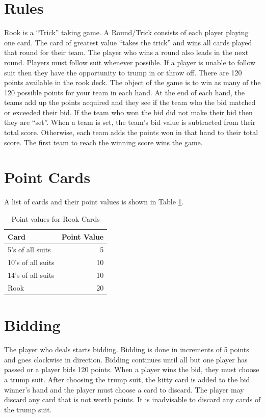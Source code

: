 \documentclass[12pt]{report}
\begin{document}
\section{Rules}

Rook is a ``Trick'' taking game. A Round/Trick consists of each player playing one card. The card of greatest value ``takes the trick'' and wins all cards played that round for their team. The player who wins a round also leads in the next round. Players must follow suit whenever possible. If a player is unable to follow suit then they have the opportunity to trump in or throw off. There are 120 points available in the rook deck. The object of the game is to win as many of the 120 possible points for your team in each hand. At the end of each hand, the teams add up the points acquired and they see if the team who the bid matched or exceeded their bid. If the team who won the bid did not make their bid then they are ``set''. When a team is set, the team's bid value is subtracted from their total score. Otherwise, each team adds the points won in that hand to their total score. The first team to reach the winning score wins the game.

\section{Point Cards}

A list of cards and their point values is shown in Table \ref{tab:pointcards}.

\begin{table}[ht]
\begin{center}
\begin{tabular}{l r}
Card & Point Value \\ \hline
5's of all suits & 5 \\
10's of all suits & 10 \\
14's of all suits & 10 \\
Rook & 20 \\ \hline
\end{tabular}
\end{center}
\caption{Point values for Rook Cards}
\label{tab:pointcards}
\end{table}

\section{Bidding}

The player who deals starts bidding. Bidding is done in increments of 5 points and goes clockwise in direction. Bidding continues until all but one player has passed or a player bids 120 points. When a player wins the bid, they must choose a trump suit. After choosing the trump suit, the kitty card is added to the bid winner's hand and the player must choose a card to discard. The player may discard any card that is not worth points. It is inadvisable to discard any cards of the trump suit.
\end{document}
